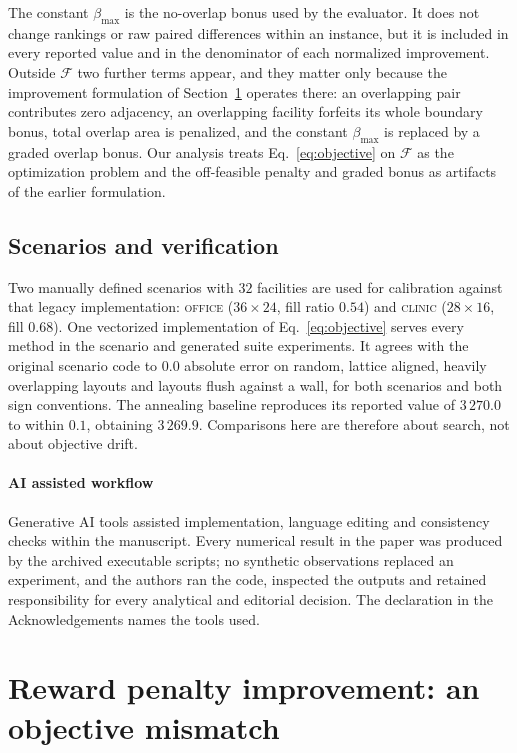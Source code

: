 \documentclass[preprint,12pt,authoryear]{elsarticle}
\newcommand{\cF}{\mathcal{F}}
\newif\iflegacydetails
\begin{document}
The constant $\beta_{\max}$ is the no-overlap bonus used by the evaluator. It
does not change rankings or raw paired differences within an instance, but it
is included in every reported value and in the denominator of each normalized
improvement. Outside $\cF$ two further terms appear, and they matter only because the
improvement formulation of Section~\ref{sec:improve} operates there: an
overlapping pair contributes zero adjacency, an overlapping facility forfeits its
whole boundary bonus, total overlap area is penalized, and the constant
$\beta_{\max}$ is replaced by a graded overlap bonus. Our analysis treats
Eq.~\eqref{eq:objective} on $\cF$ as the optimization problem and the off-feasible
penalty and graded bonus as artifacts of the earlier formulation.

\subsection{Scenarios and verification}
Two manually defined scenarios with $32$ facilities are used for calibration against that legacy
implementation: \textsc{office} ($36\times24$, fill ratio $0.54$) and \textsc{clinic}
($28\times16$, fill $0.68$). One vectorized implementation of
Eq.~\eqref{eq:objective} serves every method in the scenario and generated suite
experiments. It agrees with the
original scenario code to $0.0$ absolute error on random, lattice aligned,
heavily overlapping layouts and layouts flush against a wall, for both scenarios and both sign
conventions. The annealing baseline reproduces its reported value of
$3\,270.0$ to within $0.1$, obtaining $3\,269.9$. Comparisons here are therefore about search, not
about objective drift.

\paragraph{AI assisted workflow}
Generative AI tools assisted implementation, language editing and
consistency checks within the manuscript. Every numerical result in the paper was
produced by the archived executable scripts; no synthetic observations replaced
an experiment, and the authors ran the code, inspected the outputs and retained
responsibility for every analytical and editorial decision. The declaration in
the Acknowledgements names the tools used.

\iflegacydetails
\section{Reward penalty improvement: an objective mismatch}
\label{sec:improve}
\end{document}
